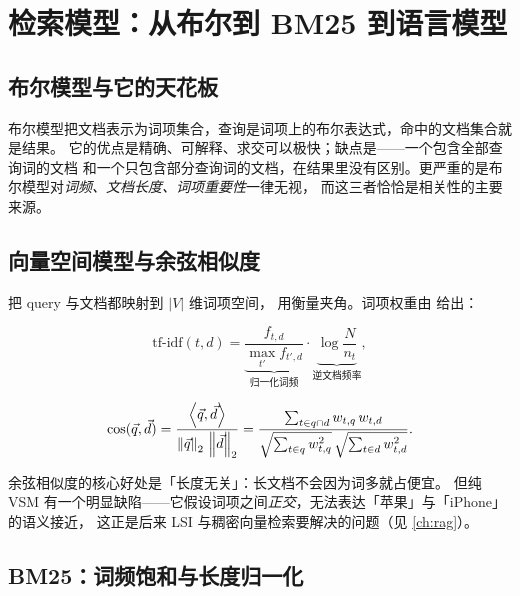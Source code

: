\section{检索模型：从布尔到 BM25 到语言模型}
\label{sec:search-model}

\subsection{布尔模型与它的天花板}

布尔模型把文档表示为词项集合，查询是词项上的布尔表达式，命中的文档集合就是结果。
它的优点是精确、可解释、求交可以极快；缺点是——一个包含全部查询词的文档
和一个只包含部分查询词的文档，在结果里没有区别。更严重的是布尔模型对\emph{词频、文档长度、词项重要性}一律无视，
而这三者恰恰是相关性的主要来源。

\subsection{向量空间模型与余弦相似度}

\cite{salton1975vsm} 把 query 与文档都映射到 $|V|$ 维词项空间，
用衡量夹角。词项权重由  给出：

\begin{equation}
\text{tf-idf}(t, d) = \underbrace{\frac{f_{t,d}}{\max_{t'} f_{t',d}}}_{\text{归一化词频}} \cdot
\underbrace{\log \frac{N}{n_t}}_{\text{逆文档频率}} ,
\label{eq:tfidf}
\end{equation}

\begin{equation}
\cos(\vec{q}, \vec{d}) = \frac{\left\langle \vec{q}, \vec{d} \right\rangle}{\left\lVert \vec{q} \right\rVert_2 \, \left\lVert \vec{d} \right\rVert_2}
= \frac{\sum_{t \in q \cap d} w_{t,q} \, w_{t,d}}
{\sqrt{\sum_{t \in q} w_{t,q}^2} \, \sqrt{\sum_{t \in d} w_{t,d}^2}} .
\label{eq:cosine}
\end{equation}

余弦相似度的核心好处是「长度无关」：长文档不会因为词多就占便宜。
但纯 VSM 有一个明显缺陷——它假设词项之间\emph{正交}，无法表达「苹果」与「iPhone」的语义接近，
这正是后来 LSI\cite{deerwester1990lsi} 与稠密向量检索要解决的问题（见 \cref{ch:rag}）。

\subsection{BM25：词频饱和与长度归一化}

